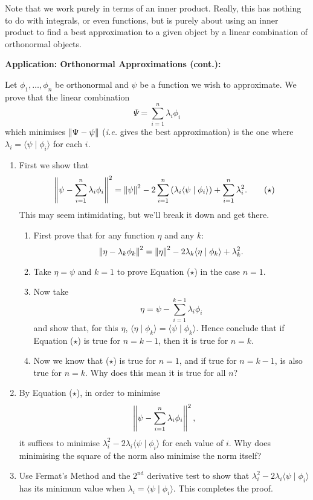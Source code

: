 \documentclass{article}
\newcommand{\norm}[1]{\left|\kern-1pt\left|#1\right|\kern-1pt\right|}
\begin{document}
 Note that we work purely in terms of an inner product. Really, this has nothing to do with integrals, or even functions, but is purely about using an inner product to find a best approximation to a given object by a linear combination of orthonormal objects.
 
 \clearpage
 
 
 
 \textbf{Application: Orthonormal Approximations (cont.):}\bigskip
 
 Let $\phi_1,\hdots,\phi_n$ be orthonormal and $\psi$ be a function we wish to approximate. We prove that the linear combination
 \[\Psi=\sum_{i=1}^n \lambda_i\phi_i\]
 which minimises $\norm{\Psi-\psi}$ (\textit{i.e.} gives the best approximation) is the one where $\lambda_i=\langle\psi\mid\phi_i\rangle$ for each $i$.
 
 
 
 
 
 
 
 \begin{enumerate}
 	\item First we show that
 		\begin{equation}
 			\norm{\psi-\sum_{i=1}^n \lambda_i\phi_i}^2=\norm{\psi}^2 - 2 \sum_{i=1}^n \left(\lambda_i\langle\psi\mid\phi_i\rangle\right) + \sum_{i=1}^n \lambda_i^2 .\tag{$\star$}
		\end{equation}
 		This may seem intimidating, but we'll break it down and get there.
 		\begin{enumerate}
 			\item First prove that for any function $\eta$ and any $k$:
 				\[\norm{\eta-\lambda_k\phi_k}^2=\norm{\eta}^2-2\lambda_k\langle\eta\mid\phi_k\rangle + \lambda_k^2.\]
			\item Take $\eta=\psi$ and $k=1$ to prove Equation ($\star$) in the case $n=1$.
			\item Now take
				\[\eta = \psi-\sum_{i=1}^{k-1}\lambda_i\phi_i\]
				and show that, for this $\eta$, $\langle\eta\mid\phi_k\rangle=\langle\psi\mid\phi_k\rangle$. Hence conclude that if Equation ($\star$) is true for $n=k-1$, then it is true for $n=k$.
			\item Now we know that ($\star$) is true for $n=1$, and if true for $n=k-1$, is also true for $n=k$. Why does this mean it is true for all $n$?
 		\end{enumerate}
	\item By Equation ($\star$), in order to minimise
		\[\norm{\psi-\sum_{i=1}^n \lambda_i\phi_i}^2,\]
		it suffices to minimise $\lambda_i^2-2\lambda_i\langle\psi\mid\phi_i\rangle$ for each value of $i$. Why does minimising the square of the norm also minimise the norm itself?
	\item Use Fermat's Method and the $2^\mathrm{nd}$ derivative test to show that $\lambda_i^2-2\lambda_i\langle\psi\mid\phi_i\rangle$ has its minimum value when $\lambda_i=\langle\psi\mid\phi_i\rangle$. This completes the proof.
\end{enumerate}
	
\end{document}
